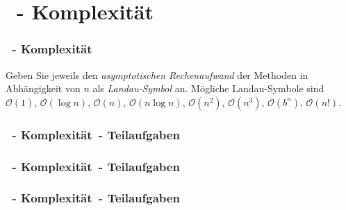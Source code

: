 \def\stitle{\theexercise\ - Komplexit\"at}
\section{\stitle}
\begin{frame}%
  \frametitle{\stitle}%

Geben Sie jeweils den \emph{asymptotischen Rechenaufwand} der Methoden in Abh\"angigkeit von $n$ als \emph{Landau-Symbol} an.
M\"ogliche Landau-Symbole sind $\mathcal{O}(1)$, $\mathcal{O}(\log n)$, $\mathcal{O}(n)$, $\mathcal{O}(n \log n)$, $\mathcal{O}(n^2)$, $\mathcal{O}(n^3)$, $\mathcal{O}(b^n)$, $\mathcal{O}(n!)$.
\medskip



\end{frame}

\begin{frame}%
  \frametitle{\stitle\ - Teilaufgaben}%


\end{frame}

\begin{frame}[t]%
  \frametitle{\stitle\ - Teilaufgaben}%


\end{frame}

\begin{frame}[t]%
  \frametitle{\stitle\ - Teilaufgaben}%

\end{frame}
